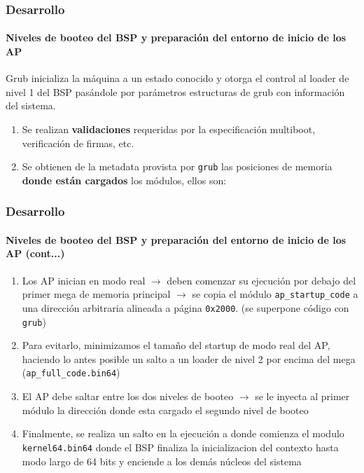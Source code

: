 \documentclass{beamer}
\begin{document}
\begin{frame}
  \frametitle{Desarrollo}
  \framesubtitle{Niveles de booteo del BSP y preparación del entorno de inicio de los AP}
  \small Grub inicializa la máquina a un estado conocido y otorga el control al loader de nivel 1 del BSP pasándole por parámetros estructuras de grub con información del sistema.
  \begin{enumerate}
  \item Se realizan \textbf{validaciones} requeridas por la especificación multiboot, verificación de firmas, etc.
  \item Se obtienen de la metadata provista por \texttt{grub} las posiciones de memoria \textbf{donde están cargados} los módulos, ellos son:
  \vspace{0.1cm}
  \end{enumerate}
\end{frame}

\begin{frame}
  \frametitle{Desarrollo}
  \framesubtitle{Niveles de booteo del BSP y preparación del entorno de inicio de los AP (cont...)}
  \begin{enumerate}
    \setlength{\itemsep}{10pt}
   \small
  \item Los AP inician en modo real $\rightarrow$ deben comenzar su ejecución por debajo del primer mega de memoria principal $\rightarrow$
  se copia el módulo \texttt{ap\_startup\_code} a una dirección arbitraria alineada a página \texttt{0x2000}. (se superpone código con \texttt{grub})
  \pause  
  \item Para evitarlo, minimizamos el tamaño del startup de modo real del AP, haciendo lo antes posible un salto a un loader de nivel 2 por encima del mega (\texttt{ap\_full\_code.bin64})
  \pause
  \item El AP debe saltar entre los dos niveles de booteo $\rightarrow$ se le inyecta al primer módulo la dirección donde esta cargado el segundo nivel de booteo
  \pause
  \item Finalmente, se realiza un salto en la ejecución a donde comienza el modulo \texttt{kernel64.bin64} donde el BSP finaliza la inicializacion del contexto hasta modo largo de 64 bits y enciende a los demás núcleos del sistema
  \end{enumerate}
\end{frame}
\end{document}
